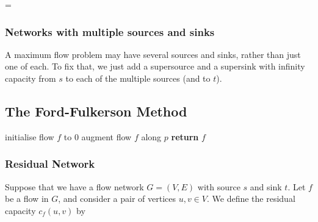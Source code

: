 \documentclass[12pt]{article}
\begin{document}
\begin{minipage}{.5\textwidth}
\centering
{} 
\end{minipage}%
=
\begin{minipage}{.5\textwidth}
\centering
{} 
\end{minipage}

\subsubsection{Networks with multiple sources and sinks}
A maximum flow problem may have several sources and sinks, rather than just one of each. To fix that, we just add a supersource and a supersink with infinity capacity from $s$ to each of the multiple sources (and to $t$).
\subsection{The Ford-Fulkerson Method}

\begin{algorithm}
\begin{algorithmic}[1]
   \State initialise flow $f$ to $0$
      \State augment flow $f$ along $p$
   \EndWhile
   \State \textbf{return} $f$
\end{algorithmic}
\end{algorithm}
\subsubsection{Residual Network}
Suppose that we have a flow network $G = (V, E)$ with source $s$ and sink $t$. Let $f$ be a flow in $G$, and consider a pair of vertices $u, v \in V$. We define the residual capacity $c_f(u, v)$ by
\end{document}
